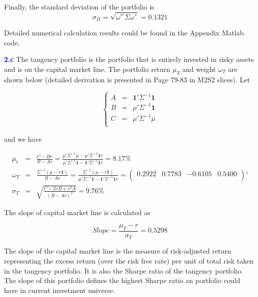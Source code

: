 \documentclass[a4paper,11pt] {article}
\begin{document}
Finally, the standard deviation of the portfolio is
$$
\sigma_{\Pi} = \sqrt{\omega^{*'}\Sigma\omega^*} = 0.1321
$$

Detailed numerical calculation results could be found in the Appendix Matlab code.

\textcolor{blue}{\bf 2.c } The tangency portfolio is the portfolio that is entirely invested in risky assets and is on the capital market line. The portfolio return $\mu_T$ and weight $\omega_T$ are shown below (detailed derivation is presented in Page 79-83 in M2S2 slices). Let

$$
\left\{
  \begin{array}{rcr}
    A & = & \mathbf{1}'\Sigma^{-1}\mathbf{1} \\
    B & = & \mu'\Sigma^{-1}\mathbf{1} \\
    C & = & \mu'\Sigma^{-1}\mu \\
  \end{array}
\right.
$$

and we have

\begin{eqnarray*}
\mu_t &=& \frac{C-Br}{B-Ar} = \frac{\mu'\Sigma^{-1}\mu - \mu'\Sigma^{-1}\mathbf{1}r}{\mu'\Sigma^{-1}\mathbf{1} - \mathbf{1}'\Sigma^{-1}\mathbf{1}r} = 8.17\% \\
\omega_T &=& \frac{\Sigma^{-1}(\mu-r\mathbf{1})}{B-Ar} = \frac{\Sigma^{-1}(\mu-r\mathbf{1})}{\mu'\Sigma^{-1}\mathbf{1} - \mathbf{1}'\Sigma^{-1}\mathbf{1}r} = \left(
                                       \begin{array}{cccc}
                                         0.2922 & 0.7783 & -0.6105 & 0.5400 \\
                                       \end{array}
                                     \right)' \\
\sigma_T &=& \sqrt{\frac{C-2rB+r^2A}{(B-Ar)^2}} = 9.76\%
\end{eqnarray*}

The slope of capital market line is calculated as

$$
Slope = \frac{\mu_T - r}{\sigma_T} = 0.5298
$$

The slope of the capital market line is the measure of risk-adjusted return representing the excess return (over the risk free rate) per unit of total risk taken in the tangency portfolio. It is also the Sharpe ratio of the tangency portfolio. The slope of this portfolio defines the highest Sharpe ratio an portfolio could have in current investment universe.
\end{document}
